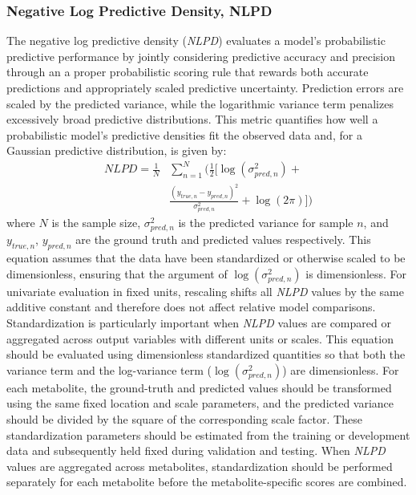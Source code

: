 \subsubsection{Negative Log Predictive Density, \textnormal{NLPD}}
\label{sec:Eval:subsec:RegMetrics:subsubsec:NLPD}
The negative log predictive density (\textit{NLPD}) evaluates a model's probabilistic predictive performance by jointly considering predictive accuracy and precision through an a proper probabilistic scoring rule that rewards both accurate predictions and appropriately scaled predictive uncertainty. Prediction errors are scaled by the predicted variance, while the logarithmic variance term penalizes excessively broad predictive distributions. This metric quantifies how well a probabilistic model's predictive densities fit the observed data and, for a Gaussian predictive distribution, is given by:
\begin{equation}\label{eqn:NLPD}
    \begin{aligned}
        NLPD = \frac{1}{N}&\sum_{n=1}^N \Bigg( \frac{1}{2} \Bigg[ \log(\sigma_{pred,n}^2) + \\
         & \frac{(y_{true,n}-y_{pred,n})^2}{\sigma_{pred,n}^2} + \log(2\pi) \Bigg] \Bigg)
    \end{aligned}
\end{equation}
\noindent where $N$ is the sample size, $\sigma^2_{pred,n}$ is the predicted variance for sample $n$, and $y_{true,n}$, $y_{pred,n}$ are the ground truth and predicted values respectively. This equation assumes that the data have been standardized or otherwise scaled to be dimensionless, ensuring that the argument of $\log(\sigma_{pred,n}^2)$ is dimensionless. For univariate evaluation in fixed units, rescaling shifts all \textit{NLPD} values by the same additive constant and therefore does not affect relative model comparisons. Standardization is particularly important when \textit{NLPD} values are compared or aggregated across output variables with different units or scales. This equation should be evaluated using dimensionless standardized quantities so that both the variance term and the log-variance term ($\log(\sigma_{pred,n}^2)$) are dimensionless. For each metabolite, the ground-truth and predicted values should be transformed using the same fixed location and scale parameters, and the predicted variance should be divided by the square of the corresponding scale factor. These standardization parameters should be estimated from the training or development data and subsequently held fixed during validation and testing. When \textit{NLPD} values are aggregated across metabolites, standardization should be performed separately for each metabolite before the metabolite-specific scores are combined.

